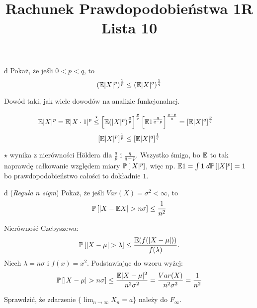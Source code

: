 \documentclass{article}
\title{Rachunek Prawdopodobieństwa 1R\\{\normalsize Lista 10}}
\author{}
\date{}
\begin{document}
\maketitle\thispagestyle{empty}

\begin{problem}{d}
  Pokaż, że jeśli $0<p<q$, to
  $$\left(\mathbb{E}|X|^p\right)^\frac{1}{p}\leq\left(\mathbb{E}|X|^q\right)^\frac{1}{q}$$
\end{problem}

  Dowód taki, jak wiele dowodów na analizie funkcjonalnej.

\begin{align*}
  \mathbb{E}|X|^p&=\mathbb{E}|X\cdot 1|^p\overset{\star}{\leq} \left[\mathbb{E}(|X|^p)^\frac{q}{p}\right]^\frac{p}{q}\left[\mathbb{E}1^{\frac{q}{q-p}}\right]^\frac{q-p}{q}=\left[\mathbb{E}|X|^q\right]^\frac{p}{q}
\end{align*}
  $$\left[\mathbb{E}|X|^p\right]^\frac{1}{p}\leq \left[\mathbb{E}|X|^q\right]^\frac{1}{q}$$

  $\star$ wynika z nierówności H\"oldera dla $\frac{q}{p}$ i $\frac{q}{q-p}$. Wszystko śmiga, bo $\mathbb{E}$ to tak naprawdę całkowanie względem miary $\prob{|X|^p}$, więc np. $\e1=\int 1\;d\prob{|X|^p}=1$ bo prawdopodobieństwo całości to dokładnie $1$.

\begin{problem}{d}
  (\emph{Reguła $n$ sigm}) Pokaż, że jeśli $Var(X)=\sigma^2<\infty$, to
  $$\prob{|X-\e X|>n\sigma}\leq\frac{1}{n^2}$$
\end{problem}

Nierówność Czebyszewa:
$$\prob{|X-\mu|>\lambda}\leq\frac{\e(f(|X-\mu|))}{f(\lambda)}.$$
Niech $\lambda=n\sigma$ i $f(x)=x^2$. Podstawiając do wzoru wyżej:
$$\prob{|X-\mu|>n\sigma}\leq\frac{\e|X-\mu|^2}{n^2\sigma^2}=\frac{Var(X)}{n^2\sigma^2}=\frac{1}{n^2}$$

\begin{problem}{}
  Sprawdzić, że zdarzenie $\{\lim_{n\to\infty}X_n=a\}$ należy do $F_\infty$.
\end{problem}
\end{document}
